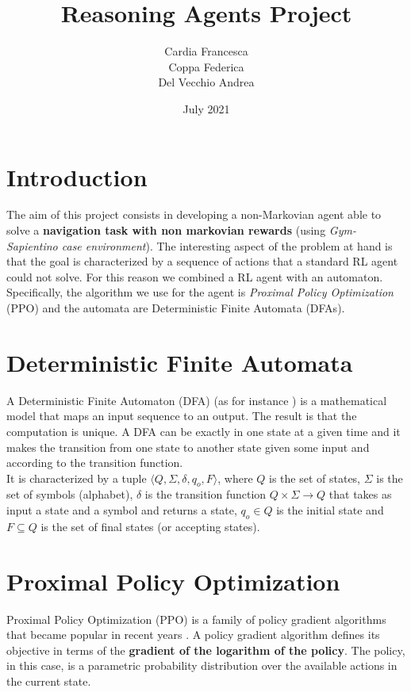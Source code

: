 \documentclass{article}
\title{Reasoning Agents Project}
\author{Cardia Francesca\\
        Coppa Federica\\
        Del Vecchio Andrea}
\date{July 2021}
\begin{document}
\maketitle

\section{Introduction}
The aim of this project consists in developing a non-Markovian agent able to solve a \textbf{navigation task with non markovian rewards} (using \textit{ Gym-Sapientino case environment}). The interesting aspect of the problem at hand is that the goal is characterized by a sequence of actions that a standard RL agent could not solve. For this reason we combined a RL agent with an automaton. Specifically, the algorithm we use for the agent is \textit{Proximal Policy Optimization} (PPO) and the automata are Deterministic Finite Automata (DFAs).

\section{Deterministic Finite Automata}
A Deterministic Finite Automaton (DFA) (as for instance \cite{dfa})
is a mathematical model that maps an input sequence to an output.  The result is that the computation is unique. A DFA can be exactly in one state at a given time and it makes the transition from one state to another state given some input and according to the transition function.\\
It is characterized by a tuple $\langle Q, \Sigma, \delta, q_o ,F \rangle$, where $Q$ is the set of states, $\Sigma$ is the set of symbols (alphabet), $\delta$  is the transition function $Q \times \Sigma \longrightarrow Q$ that takes as input a state and a symbol and returns a state, $q_o \in Q$ is the initial state and $F \subseteq Q$ is the set of final states (or accepting states).





\section{Proximal Policy Optimization}
Proximal Policy Optimization (PPO) is a family of policy gradient algorithms that became popular in recent years \cite{schulman2017proximal_PPO}. A policy gradient algorithm defines its objective in terms of the \textbf{gradient of the logarithm of the policy}. The policy, in this case, is a parametric probability distribution over the available actions in the current state.
\end{document}
